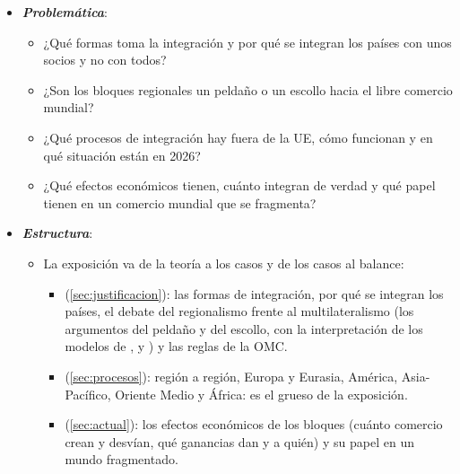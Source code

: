 \documentclass[11pt]{article}
\begin{document}
\begin{itemize}
\item \textbf{\emph{Problemática}}:
  \begin{itemize}
  \item ¿Qué formas toma la integración y por qué se integran los países con unos socios y no con todos?
  \item ¿Son los bloques regionales un peldaño o un escollo hacia el libre comercio mundial?
  \item ¿Qué procesos de integración hay fuera de la UE, cómo funcionan y en qué situación están en 2026?
  \item ¿Qué efectos económicos tienen, cuánto integran de verdad y qué papel tienen en un comercio mundial que se fragmenta?
  \end{itemize}

\item \textbf{\emph{Estructura}}:
  \begin{itemize}
  \item La exposición va de la teoría a los casos y de los casos al balance:
    \begin{itemize}
    \item {} (\ref{sec:justificacion}): las formas de integración, por qué se integran los países, el debate del regionalismo frente al multilateralismo (los argumentos del peldaño y del escollo, con la interpretación de los modelos de ,  y ) y las reglas de la OMC.
    \item {} (\ref{sec:procesos}): región a región, Europa y Eurasia, América, Asia-Pacífico, Oriente Medio y África: es el grueso de la exposición.
    \item {} (\ref{sec:actual}): los efectos económicos de los bloques (cuánto comercio crean y desvían, qué ganancias dan y a quién) y su papel en un mundo fragmentado.
    \end{itemize}
  \end{itemize}
\end{itemize}
\end{document}
